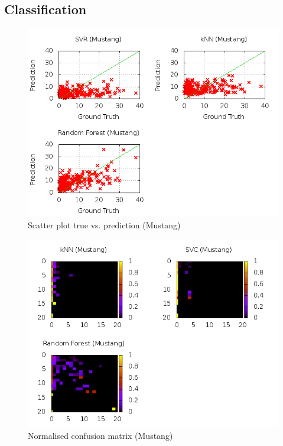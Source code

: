 \subsection{Classification}
\begin{figure}
\centering
\includegraphics[scale=0.55]{images/plots/machine_learning/mustang/true_pred_mustang.png}
\caption{Scatter plot true vs. prediction (Mustang)}
\label{true_predict_mustang}
\end{figure}
\begin{figure}
\centering
\includegraphics[scale=0.55]{images/plots/machine_learning/mustang/conf_mat_mustang.png}
\caption{Normalised confusion matrix (Mustang)}
\label{conf_mat_mustang}
\end{figure}
